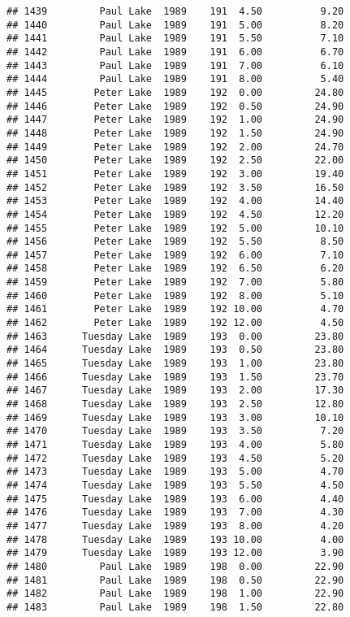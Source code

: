 \documentclass[
]{article}
\begin{document}
\begin{verbatim}
## 1439         Paul Lake  1989    191  4.50          9.20
## 1440         Paul Lake  1989    191  5.00          8.20
## 1441         Paul Lake  1989    191  5.50          7.10
## 1442         Paul Lake  1989    191  6.00          6.70
## 1443         Paul Lake  1989    191  7.00          6.10
## 1444         Paul Lake  1989    191  8.00          5.40
## 1445        Peter Lake  1989    192  0.00         24.80
## 1446        Peter Lake  1989    192  0.50         24.90
## 1447        Peter Lake  1989    192  1.00         24.90
## 1448        Peter Lake  1989    192  1.50         24.90
## 1449        Peter Lake  1989    192  2.00         24.70
## 1450        Peter Lake  1989    192  2.50         22.00
## 1451        Peter Lake  1989    192  3.00         19.40
## 1452        Peter Lake  1989    192  3.50         16.50
## 1453        Peter Lake  1989    192  4.00         14.40
## 1454        Peter Lake  1989    192  4.50         12.20
## 1455        Peter Lake  1989    192  5.00         10.10
## 1456        Peter Lake  1989    192  5.50          8.50
## 1457        Peter Lake  1989    192  6.00          7.10
## 1458        Peter Lake  1989    192  6.50          6.20
## 1459        Peter Lake  1989    192  7.00          5.80
## 1460        Peter Lake  1989    192  8.00          5.10
## 1461        Peter Lake  1989    192 10.00          4.70
## 1462        Peter Lake  1989    192 12.00          4.50
## 1463      Tuesday Lake  1989    193  0.00         23.80
## 1464      Tuesday Lake  1989    193  0.50         23.80
## 1465      Tuesday Lake  1989    193  1.00         23.80
## 1466      Tuesday Lake  1989    193  1.50         23.70
## 1467      Tuesday Lake  1989    193  2.00         17.30
## 1468      Tuesday Lake  1989    193  2.50         12.80
## 1469      Tuesday Lake  1989    193  3.00         10.10
## 1470      Tuesday Lake  1989    193  3.50          7.20
## 1471      Tuesday Lake  1989    193  4.00          5.80
## 1472      Tuesday Lake  1989    193  4.50          5.20
## 1473      Tuesday Lake  1989    193  5.00          4.70
## 1474      Tuesday Lake  1989    193  5.50          4.50
## 1475      Tuesday Lake  1989    193  6.00          4.40
## 1476      Tuesday Lake  1989    193  7.00          4.30
## 1477      Tuesday Lake  1989    193  8.00          4.20
## 1478      Tuesday Lake  1989    193 10.00          4.00
## 1479      Tuesday Lake  1989    193 12.00          3.90
## 1480         Paul Lake  1989    198  0.00         22.90
## 1481         Paul Lake  1989    198  0.50         22.90
## 1482         Paul Lake  1989    198  1.00         22.90
## 1483         Paul Lake  1989    198  1.50         22.80

\end{verbatim}
\end{document}
